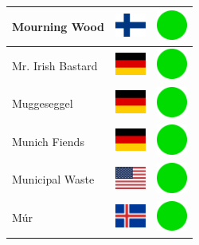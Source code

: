 \documentclass[12pt, a4paper, twoside]{report}
\begin{document}
\begin{center}
\begin{longtable}{|p{5cm}|p{2cm}|p{2cm}|}
 Mourning Wood                                              & \includegraphics[width=1cm]{../img/flags/fi} &   \includegraphics[width=1cm]{../likes/y} \\ \hline
 Mr. Irish Bastard                                          & \includegraphics[width=1cm]{../img/flags/de} &   \includegraphics[width=1cm]{../likes/y} \\ \hline
 Muggeseggel                                                & \includegraphics[width=1cm]{../img/flags/de} &   \includegraphics[width=1cm]{../likes/y} \\ \hline
 Munich Fiends                                              & \includegraphics[width=1cm]{../img/flags/de} &   \includegraphics[width=1cm]{../likes/y} \\ \hline
 Municipal Waste                                            & \includegraphics[width=1cm]{../img/flags/us} &   \includegraphics[width=1cm]{../likes/y} \\ \hline
 Múr                                                        & \includegraphics[width=1cm]{../img/flags/is} &   \includegraphics[width=1cm]{../likes/y} \\ \hline

\end{longtable}
\end{center}
\end{document}
